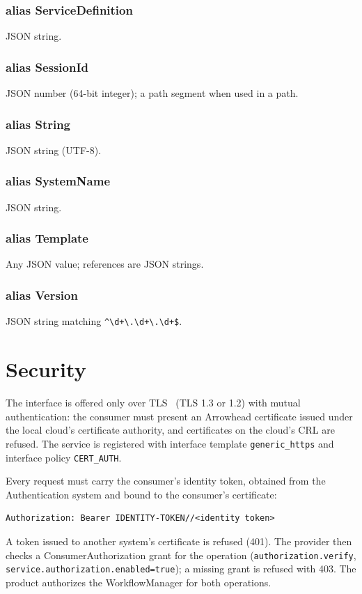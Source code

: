 \documentclass[a4paper]{arrowhead}
\newcommand{\pdef}[1]{{\textcolor{ArrowheadGrey}{#1\label{sec:model:primitives:#1}\label{sec:model:primitives:#1s}}}}
\begin{document}
\subsubsection*{alias \pdef{ServiceDefinition}}
JSON string.

\subsubsection*{alias \pdef{SessionId}}
JSON number (64-bit integer); a path segment when used in a path.

\subsubsection*{alias \pdef{String}}
JSON string (UTF-8).

\subsubsection*{alias \pdef{SystemName}}
JSON string.

\subsubsection*{alias \pdef{Template}}
Any JSON value; references are JSON strings.

\subsubsection*{alias \pdef{Version}}
JSON string matching \texttt{\^{}\textbackslash{}d+\textbackslash{}.\textbackslash{}d+\textbackslash{}.\textbackslash{}d+\$}.



\section{Security}
\label{sec:security}
The interface is offered only over TLS~\cite{rfc8446} (TLS 1.3 or 1.2) with mutual authentication: the consumer must
present an Arrowhead certificate issued under the local cloud's certificate authority, and certificates on the
cloud's CRL are refused. The service is registered with interface template \texttt{generic\_\allowbreak{}https} and interface
policy \texttt{CERT\_AUTH}.

Every request must carry the consumer's identity token, obtained from the Authentication system and bound to the
consumer's certificate:
\begin{lstlisting}
Authorization: Bearer IDENTITY-TOKEN//<identity token>
\end{lstlisting}
A token issued to another system's certificate is refused (401). The provider then checks a ConsumerAuthorization
grant for the operation (\texttt{authorization.\allowbreak{}verify}, \texttt{service.\allowbreak{}authorization.\allowbreak{}enabled=\allowbreak{}true}); a missing grant is
refused with 403. The product authorizes the WorkflowManager for both operations.
\end{document}
